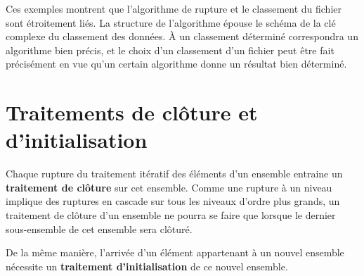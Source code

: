 
Ces exemples montrent que l’algorithme de rupture et le classement du
fichier sont étroitement liés. La structure de l’algorithme épouse le
schéma de la clé complexe du classement des données. À un classement
déterminé correspondra un algorithme bien précis, et le choix d’un
classement d’un fichier peut être fait précisément en vue qu’un certain
algorithme donne un résultat bien déterminé.


\section{Traitements de clôture et d’initialisation}

Chaque rupture du traitement itératif des éléments d’un ensemble
entraine un \textbf{traitement de clôture} sur cet ensemble. Comme une
rupture à un niveau implique des ruptures en cascade sur tous les
niveaux d’ordre plus grands, un traitement de clôture d’un ensemble ne
pourra se faire que lorsque le dernier sous-ensemble de cet ensemble
sera clôturé.

De la même manière, l’arrivée d’un élément appartenant à un nouvel
ensemble nécessite un \textbf{traitement d’initialisation} de ce nouvel
ensemble.

